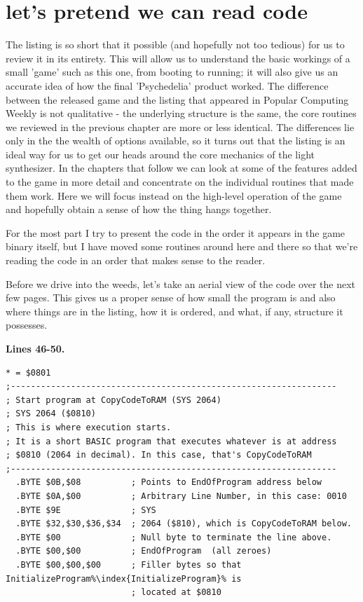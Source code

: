 \chapter{let's pretend we can read code} 
\label{sec:commentary}
\rhead[]{\leftmark}
\lstset{style=6502Style}
\lstset{ 
   aboveskip=5pt,
   belowskip=0pt,
}
The listing is so short that it possible (and hopefully not too tedious) for us to
review it in its entirety. This will allow us to understand the basic workings of 
a small 'game' such as this one, from booting to running; it will also give us an
accurate idea of how the final 'Psychedelia' product worked. The difference between
the released game and the listing that appeared in Popular Computing Weekly is not
qualitative - the underlying structure is the same, the core routines we reviewed 
in the previous chapter are more or less identical. The differences lie only in the
the wealth of options available, so it turns out that the listing is an ideal way
for us to get our heads around the core mechanics of the light synthesizer. In the
chapters that follow we can look at some of the features added to the game in more
detail and concentrate on the individual routines that made them work. Here we will
focus instead on the high-level operation of the game and hopefully obtain a sense
of how the thing hangs together.

For the most part I try to present the code in the order it appears in the game
binary itself, but I have moved some routines around here and there so that we're
reading the code in an order that makes sense to the reader.

Before we drive into the weeds, let's take an aerial view of the code over the next
few pages. This gives us a proper sense of how small the program is and also where
things are in the listing, how it is ordered, and what, if any, structure it possesses.


\clearpage
\textbf{Lines 46-50. }
\begin{lstlisting}[caption=The bootstrap routine common to nearly every C64\index{C64} program,escapechar=\%]
* = $0801
;-----------------------------------------------------------------
; Start program at CopyCodeToRAM (SYS 2064)
; SYS 2064 ($0810)
; This is where execution starts.
; It is a short BASIC program that executes whatever is at address
; $0810 (2064 in decimal). In this case, that's CopyCodeToRAM
;-----------------------------------------------------------------
  .BYTE $0B,$08          ; Points to EndOfProgram address below
  .BYTE $0A,$00          ; Arbitrary Line Number, in this case: 0010
  .BYTE $9E              ; SYS
  .BYTE $32,$30,$36,$34  ; 2064 ($810), which is CopyCodeToRAM below.
  .BYTE $00              ; Null byte to terminate the line above.
  .BYTE $00,$00          ; EndOfProgram  (all zeroes)
  .BYTE $00,$00,$00      ; Filler bytes so that InitializeProgram%\index{InitializeProgram}% is
                         ; located at $0810
\end{lstlisting}

